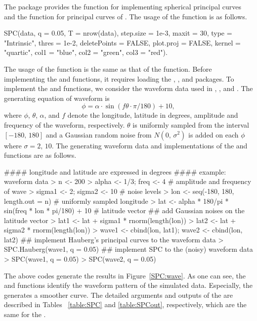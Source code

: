 The package  provides the  function for implementing spherical principal curves and the  function for principal curves of \citet{Hauberg2016}. The usage of the  function is as follows.
\begin{example}
    SPC(data, q = 0.05, T = nrow(data), step.size = 1e-3, maxit = 30,
        type = "Intrinsic", thres = 1e-2, deletePoints = FALSE,  
        plot.proj = FALSE, kernel = "quartic", col1 = "blue", 
        col2 = "green", col3 = "red").
\end{example}
The usage of the  function is the same as that of the  function. Before implementing the  and  functions, it requires loading the  \citep{Adler2020},  \citep{Robotham2013}, and  \citep{Hijmans2017} packages. To implement the  and  functions, we consider the waveform data used in \citet{Liu2017level}, \citet{Kim2020}, and \citet{Lee2021}. The generating equation of waveform is
\begin{equation*}
    \phi = \alpha\cdot \sin(f \theta\cdot \pi/180) + 10,
\end{equation*}
where $\phi$, $\theta$, $\alpha$, and $f$ denote the longitude, latitude in degrees, amplitude and frequency of the waveform, respectively. $\theta$ is uniformly sampled from the interval $[-180,\, 180]$ and a Gaussian random noise from $N(0,\, \sigma^2)$ is added on each $\phi$ where $\sigma = 2,\, 10$. The generating waveform data and implementations of the  and  functions are as follows. 
\begin{example}
   #### longitude and latitude are expressed in degrees
   #### example: waveform data
   > n <- 200
   > alpha <- 1/3; freq <- 4                    # amplitude and frequency of wave
   > sigma1 <- 2; sigma2 <- 10                  # noise levels  
   > lon <- seq(-180, 180, length.out = n)      # uniformly sampled longitude
   > lat <- alpha * 180/pi * sin(freq * lon * pi/180) + 10      # latitude vector
   ## add Gaussian noises on the latitude vector
   > lat1 <- lat + sigma1 * rnorm(length(lon))
   > lat2 <- lat + sigma2 * rnorm(length(lon))
   > wave1 <- cbind(lon, lat1); wave2 <- cbind(lon, lat2)
   ## implement Hauberg's principal curves to the waveform data
   > SPC.Hauberg(wave1, q = 0.05)
   ## implement SPC to the (noisy) waveform data
   > SPC(wave1, q = 0.05)
   > SPC(wave2, q = 0.05)
\end{example}
The above codes generate the results in Figure~\ref{SPC:wave}. As one can see, the  and  functions identify the waveform pattern of the simulated data. Especially, the  generates a smoother curve. The detailed arguments and outputs of the  are described in Tables~ \ref{table:SPC} and \ref{table:SPCout}, respectively, which are the same for the .


